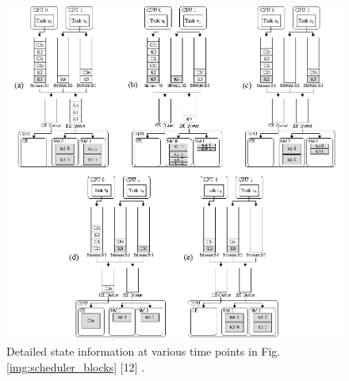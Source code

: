 \documentclass[
  12pt,
  a4paperpaper,
]{report}
\begin{document}
\begin{figure}
\centering
\includegraphics[width=1\textwidth,height=\textheight]{source/figures/scheduler_queues.png}
\caption{Detailed state information at various time points in Fig.
\ref{img:scheduler_blocks} {[}12{]} .\label{img:scheduler_queues}}
\end{figure}
\end{document}
